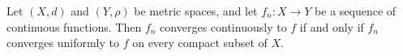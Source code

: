 \documentclass[12pt]{article}
\begin{document}
Let $(X,d)$ and $(Y,\rho)$ be metric spaces, and let $f_n:X\longrightarrow Y$ be a sequence of continuous functions. Then $f_n$ converges continuously to $f$ if and only if $f_n$ converges uniformly to $f$ on every compact subset of $X$.
\end{document}
